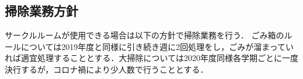 \subsection*{掃除業務方針}


サークルルームが使用できる場合は以下の方針で掃除業務を行う．
ごみ箱のルールについては2019年度と同様に引き続き週に2回処理をし，ごみが溜まっていれば適宜処理することとする．大掃除については2020年度同様各学期ごとに一度決行するが，コロナ禍により少人数で行うこととする．
